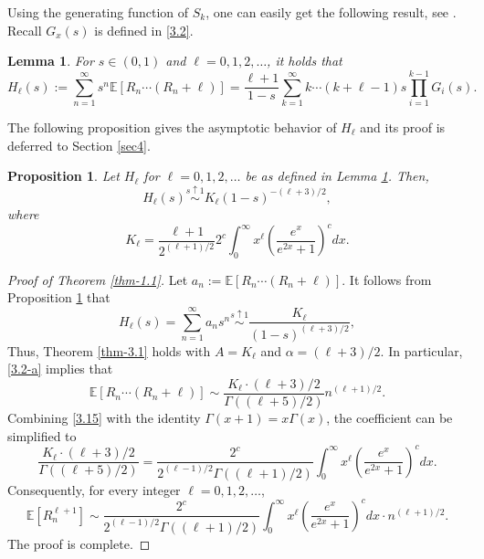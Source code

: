 \documentclass[12pt]{article}
\newtheorem{lem}[thm]{Lemma}
\newtheorem{pro}[thm]{Proposition}
\numberwithin{equation}{section}
\begin{document}
 Using the generating function of $S_k$, one can easily get the following result, see \cite[Lemma 3.3]{PS}. Recall $G_{x}(s)$  is defined in  \eqref{3.2}.
\begin{lem}\label{lem-3.4}
For $s \in(0,1)$ and $ \ell=0,1,2, \ldots$, it holds
that
\begin{equation}\label{3.15-a}
H_{\ell}(s):=\sum_{n=1}^{\infty} s^{n} \mathbb{E}\left[R_{n} \cdots\left(R_{n}+\ell\right)\right]=\frac{\ell+1}{1-s} \sum_{k=1}^{\infty} k \cdots(k+\ell-1) s \prod_{i=1}^{k-1} G_{i}(s).
\end{equation}
\end{lem}

The following proposition gives the asymptotic behavior of $H_{\ell}$ and its proof is deferred to Section \ref{sec4}.

\begin{pro}\label{pro-3.5}
Let $H_\ell$ for $\ell = 0, 1, 2, \ldots$ be as defined in Lemma \ref{lem-3.4}. Then,
\begin{equation*}
H_\ell(s) \stackrel{s \uparrow 1}{\sim} K_{\ell}(1-s)^{-(\ell+3)/2} ,
\end{equation*}
where
\begin{equation}\label{3.15}
K_{\ell}=\frac{\ell+1}{2^{(\ell+1)/2}}2^{c}\int_{0}^{\infty}x^{\ell}\left(\frac{e^{x}}{e^{2x}+1}\right)^{c}dx.
\end{equation}
\end{pro}

\smallskip

\begin{proof}[Proof of Theorem \ref{thm-1.1}]

Let $a_n := \mathbb{E}[R_n \cdots (R_n + \ell)]$. It follows from Proposition \ref{pro-3.5} that
\begin{equation*}
H_\ell(s) = \sum_{n=1}^\infty a_n s^n \stackrel{s \uparrow 1}{\sim} \frac{K_\ell}{(1-s)^{(\ell+3)/2}},
\end{equation*}
Thus, Theorem \ref{thm-3.1} holds with $A=K_{\ell}$ and $\alpha = (\ell+3)/2$. In particular, \eqref{3.2-a} implies that
\begin{equation*}
\mathbb{E}[R_n \cdots (R_n + \ell)]\sim
\frac{K_{\ell}\cdot (\ell +3)/2}{\Gamma((\ell+5)/2)}n^{(\ell+1)/2}.
\end{equation*}
Combining \eqref{3.15} with the identity  $\Gamma(x+1)=x\Gamma(x)$, the coefficient
can be simplified  to
\[
\frac{K_{\ell}\cdot (\ell +3)/2}{\Gamma((\ell+5)/2)}
=\frac{2^{c}}{2^{(\ell-1)/2}\Gamma((\ell+1)/2)} \int_{0}^{\infty}x^{\ell }\left( \frac{e^{x}}{e^{2x}+1} \right)^{c}dx.
\]
Consequently,  for  every integer  $\ell=0, 1, 2,\ldots$,
\[
\mathbb{E}[R_{n}^{\ell+1}] \sim
\frac{2^{c}}{2^{(\ell-1)/2}\Gamma((\ell+1)/2)} \int_{0}^{\infty}x^{\ell }\left( \frac{e^{x}}{e^{2x}+1} \right)^{c}dx  \cdot n^{(\ell+1)/2}.
\]
The proof is complete.
\end{proof}
\end{document}
